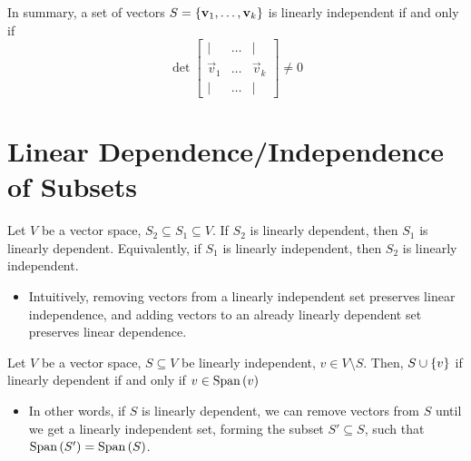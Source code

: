 \documentclass[letterpaper,12pt]{article}
\begin{document}
In summary, a set of vectors $S = \left\{ \mathbf{v}_1, \dots, \mathbf{v}_k \right\}$ is linearly independent if and only if
\begin{equation*}
    \det{\begin{bmatrix} \mid & \dots & \mid \\
    \vec{v}_1 & \dots & \vec{v}_k \\
    \mid & \dots & \mid \end{bmatrix}} \neq 0
\end{equation*}


















\section*{Linear Dependence/Independence of Subsets}
\begin{theorem}
Let $V$ be a vector space, $S_2 \subseteq S_1 \subseteq V$. If $S_2$ is linearly dependent, then $S_1$ is linearly dependent. Equivalently, if $S_1$ is linearly independent, then $S_2$ is linearly independent.
\begin{itemize}
    \item Intuitively, removing vectors from a linearly independent set preserves linear independence, and adding vectors to an already linearly dependent set preserves linear dependence.
\end{itemize}
\end{theorem}

\begin{theorem}
Let $V$ be a vector space, $S \subseteq V$ be linearly independent, $v \in V \setminus S$. Then, $S \cup \left\{ v \right\}$ if linearly dependent if and only if $v \in \text{Span}\left(v \right)$
\begin{itemize}
    \item In other words, if $S$ is linearly dependent, we can remove vectors from $S$ until we get a linearly independent set, forming the subset $S' \subseteq S$, such that $\text{Span}\left(S' \right) = \text{Span}\left(S \right)$.
\end{itemize}
\end{theorem}
\end{document}
